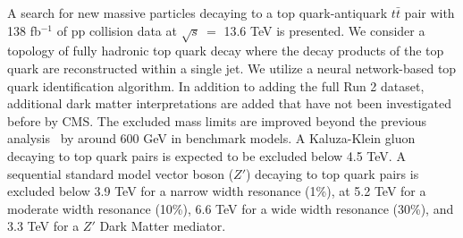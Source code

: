 
A search for new massive particles decaying to a top quark-antiquark $t\bar{t}$ pair with 138 fb$^{-1}$ of pp collision data at $\sqrt{s}\ =$ 13.6 TeV is presented. We consider a topology of fully hadronic top quark decay where the decay products of the top quark are reconstructed within a single jet. We utilize a neural network-based top quark identification algorithm. In addition to adding the full Run 2 dataset, additional dark matter interpretations are added that have not been investigated before by CMS. The excluded mass limits are improved beyond the previous analysis~\cite{13tevZprime_CMScombo2015} by around 600 GeV in benchmark models. A Kaluza-Klein gluon decaying to top quark pairs is expected to be excluded below 4.5 TeV. A sequential standard model vector boson ($Z'$) decaying to top quark pairs is excluded below 3.9 TeV for a narrow width resonance (1\%), at 5.2 TeV for a moderate width resonance (10\%), 6.6 TeV for a wide width resonance (30\%), and 3.3 TeV for a $Z'$ Dark Matter mediator. 


